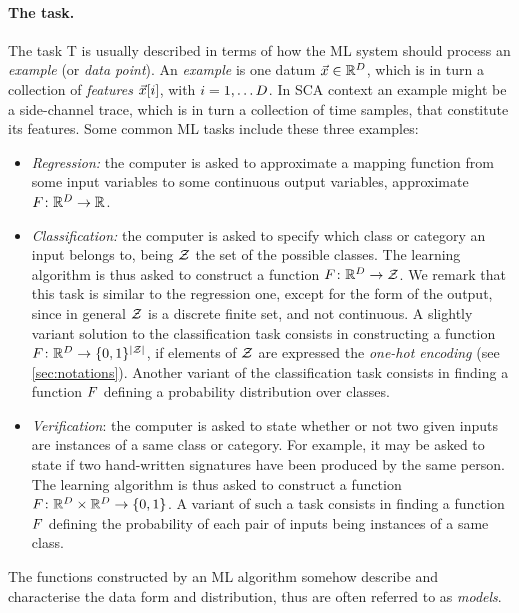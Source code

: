 \paragraph*{The task.} The task T is usually described in terms of how the ML system should process an \emph{example} (or \emph{data point}). An \emph{example} is one datum $\vec{x}\in \mathbb{R}^D$, which is in turn a collection of \emph{features} $\vec{x}[i]$, with  $i=1,\dots D$. In SCA context an example might be a side-channel trace, which is in turn a collection of time samples, that constitute its features. Some common ML tasks include these three examples: 
\begin{itemize}
\item \emph{Regression: } the computer is asked to approximate a mapping function from some input variables to some continuous output variables, \eg approximate $F\colon \mathbb{R}^D \rightarrow \mathbb{R}$.
\item \emph{Classification: } the computer is asked to specify which class or category an input belongs to, being $\mathcal{Z}$ the set of the possible classes. The learning algorithm is thus asked to construct a function $F\colon \mathbb{R}^D \rightarrow \mathcal{Z}$. We remark that this task is similar to the regression one, except for the form of the output, since in general $\mathcal{Z}$ is a discrete finite set, and not continuous. A slightly variant solution to the classification task consists in constructing a function $F\colon \mathbb{R}^D \rightarrow \{0,1\}^{\lvert\mathcal{Z}\rvert}$, if elements of $\mathcal{Z}$ are expressed \via the \emph{one-hot encoding} (see \ref{sec:notations}). Another variant of the classification task consists in finding a function $F$ defining a probability distribution over classes.
\item \emph{Verification}: the computer is asked to state whether or not two given inputs are instances of a same class or category. For example, it may be asked to state if two hand-written signatures have been produced by the same person. The learning algorithm is thus asked to construct a function $F\colon \mathbb{R}^D \times \mathbb{R}^{D}\rightarrow \{0,1\}$. A variant of such a task consists in finding a function $F$ defining the probability of each pair of inputs being instances of a same class. 
\end{itemize}
The functions constructed by an ML algorithm somehow describe and characterise the data form and distribution, thus are often referred to as \emph{models}.

